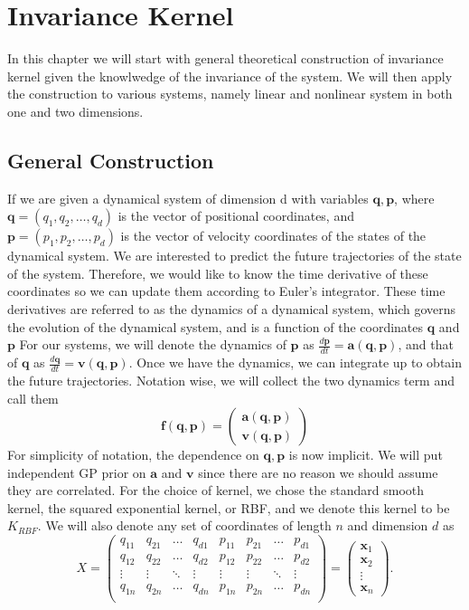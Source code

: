 \documentclass{statsmsc}
\begin{document}
\chapter{Invariance Kernel}
In this chapter we will start with general theoretical construction of invariance kernel given the knowlwedge of the invariance of the system.
We will then apply the construction to various systems, namely linear and nonlinear system in both one and two dimensions.
\section{General Construction}
If we are given a dynamical system of dimension d with variables $\mathbf{q}, \mathbf{p}$, where $\mathbf{q} = (q_1, q_2,\dots,q_d)$ is the vector of positional coordinates, and $\mathbf{p}=(p_1, p_2, \dots, p_d)$ is the vector of velocity coordinates of the states of the dynamical system.
We are interested to predict the future trajectories of the state of the system.
Therefore, we would like to know the time derivative of these coordinates so we can update them according to Euler's integrator. 
These time derivatives are referred to as the dynamics of a dynamical system, which governs the evolution of the dynamical system, and is a function of the coordinates $\mathbf{q}$ and $\mathbf{p}$ 
For our systems, we will denote the dynamics of $\mathbf{p}$ as $\frac{d\mathbf{p}}{dt}=\mathbf{a}(\mathbf{q}, \mathbf{p})$, and that of $\mathbf{q}$ as $\frac{d\mathbf{q}}{dt}=\mathbf{v}(\mathbf{q}, \mathbf{p})$.
Once we have the dynamics, we can integrate up to obtain the future trajectories. 
Notation wise, we will collect the two dynamics term and call them $$\mathbf{f(\mathbf{q}, \mathbf{p})}=\begin{pmatrix}
    \mathbf{a(\mathbf{q}, \mathbf{p})}\\\mathbf{v(\mathbf{q}, \mathbf{p})}
\end{pmatrix}$$
For simplicity of notation, the dependence on $\mathbf{q}, \mathbf{p}$ is now implicit. 
We will put independent GP prior on $\mathbf{a}$ and $\mathbf{v}$ since there are no reason we should assume they are correlated. 
For the choice of kernel, we chose the standard smooth kernel, the squared exponential kernel, or RBF, and we denote this kernel to be $K_{RBF}$. 
We will also denote any set of coordinates of length $n$ and dimension $d$ as $$X=\begin{pmatrix}
    q_{11}& q_{21} &\dots& q_{d1} & p_{11} & p_{21} & \dots & p_{d1} \\
    q_{12}& q_{22} &\dots& q_{d2} & p_{12} & p_{22} & \dots & p_{d2} \\
    \vdots &\vdots &\ddots &\vdots &\vdots &\vdots &\ddots &\vdots \\
    q_{1n}& q_{2n} &\dots& q_{dn} & p_{1n} & p_{2n} & \dots & p_{dn} \\
\end{pmatrix}=\begin{pmatrix}
    \mathbf{x}_1\\\mathbf{x}_2\\\vdots\\\mathbf{x}_n
\end{pmatrix}.$$
\end{document}
